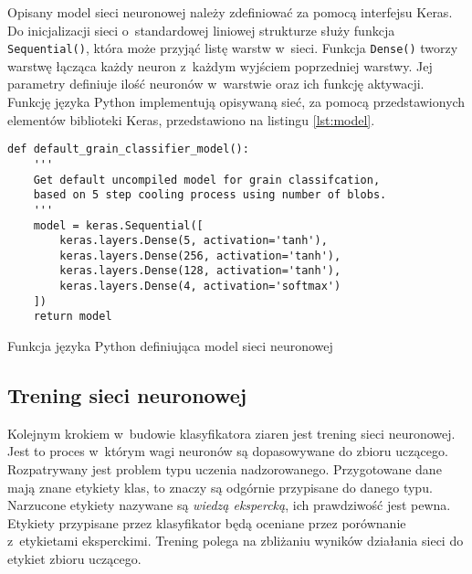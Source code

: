 Opisany model sieci neuronowej należy zdefiniować za pomocą interfejsu
Keras.
Do inicjalizacji sieci o~standardowej liniowej strukturze służy funkcja
\texttt{Sequential()}, która może przyjąć listę warstw w~sieci.
Funkcja \texttt{Dense()} tworzy warstwę łącząca każdy neuron
z~każdym wyjściem poprzedniej warstwy.
Jej parametry definiuje ilość neuronów w~warstwie oraz ich funkcję aktywacji.
Funkcję języka Python implementują opisywaną sieć, za pomocą przedstawionych
elementów biblioteki Keras, przedstawiono na listingu \ref{lst:model}.
\begin{listing}[htbp]
\begin{verbatim}
def default_grain_classifier_model():
    '''
    Get default uncompiled model for grain classifcation,
    based on 5 step cooling process using number of blobs.
    '''
    model = keras.Sequential([
        keras.layers.Dense(5, activation='tanh'),
        keras.layers.Dense(256, activation='tanh'),
        keras.layers.Dense(128, activation='tanh'),
        keras.layers.Dense(4, activation='softmax')
    ])
    return model
\end{verbatim}
\caption{Funkcja języka Python definiująca model sieci neuronowej}
\label{lst:model}
\end{listing}

\subsection{Trening sieci neuronowej}
\label{subsec:train}
Kolejnym krokiem w~budowie klasyfikatora ziaren jest trening sieci neuronowej.
Jest to proces w~którym wagi neuronów są dopasowywane do zbioru uczącego.
Rozpatrywany jest problem typu uczenia nadzorowanego.
Przygotowane dane mają znane etykiety klas, to znaczy są odgórnie przypisane
do danego typu.
Narzucone etykiety nazywane są \emph{wiedzą ekspercką}, ich prawdziwość jest
pewna.
Etykiety przypisane przez klasyfikator będą oceniane przez porównanie
z~etykietami eksperckimi.
Trening polega na zbliżaniu wyników działania sieci do etykiet zbioru
uczącego.


